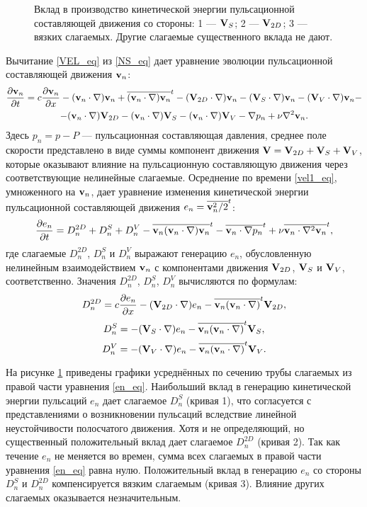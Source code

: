 \begin{figure}
\caption{Вклад в производство кинетической энергии пульсационной составляющей движения со стороны: 1 --- $\mathbf{V}_S$; 2 --- $\mathbf{V}_{2D}$; 3 --- вязких слагаемых. Другие слагаемые существенного вклада не дают.}
\label{e1_parts_pic}
\end{figure}

Вычитание \eqref{VEL_eq} из \eqref{NS_eq} дает уравнение эволюции пульсационной составляющей движения $\mathbf{v}_n$: 
\begin{multline} \label{vel1_eq}
\frac{\partial \mathbf{v}_n}{\partial t} = c \frac{\partial \mathbf{v}_n}{\partial x} - (\mathbf{v}_n \cdot \nabla) \mathbf{v}_n + \overline{(\mathbf{v}_n \cdot \nabla) \mathbf{v}_n}^t - (\mathbf{V}_{2D} \cdot \nabla) \mathbf{v}_n - (\mathbf{V}_S \cdot \nabla) \mathbf{v}_n - (\mathbf{V}_V \cdot \nabla) \mathbf{v}_n - \\ - (\mathbf{v}_n \cdot \nabla) \mathbf{V}_{2D} - (\mathbf{v}_n \cdot \nabla) \mathbf{V}_S - (\mathbf{v}_n \cdot \nabla) \mathbf{V}_V - \nabla p_n + \nu \nabla^2 \mathbf{v}_n. 
\end{multline}
Здесь $p_n = p - P$ --- пульсационная составляющая давления, среднее поле скорости представлено в виде суммы компонент движения $\mathbf{V} = \mathbf{V}_{2D} + \mathbf{V}_S + \mathbf{V}_V$, которые оказывают влияние на пульсационную составляющую движения через соответствующие нелинейные слагаемые. Осреднение по времени \eqref{vel1_eq}, умноженного на $\mathbf{v}_n$, дает уравнение изменения кинетической энергии пульсационной составляющей движения $e_n = \overline{\mathbf{v}_n^2/2}^t$: 
\begin{equation}\label{en_eq}
\frac{\partial e_n}{\partial t} = D_n^{2D} + D_n^{S} + D_n^{V} - \overline{\mathbf{v}_n (\mathbf{v}_n \cdot \nabla) \mathbf{v}_n}^t - \overline{\mathbf{v}_n \cdot \nabla p_n}^t + \nu \overline{\mathbf{v}_n \cdot \nabla^2 \mathbf{v}_n}^t,
\end{equation}
где слагаемые $D_n^{2D}$, $D_n^{S}$ и $D_n^{V}$ выражают генерацию $e_n$, обусловленную нелинейным взаимодействием $\mathbf{v}_n$ с компонентами движения $\mathbf{V}_{2D}$, $\mathbf{V}_S$ и $\mathbf{V}_V$, соответственно. Значения $D_n^{2D}$, $D_n^{S}$, $D_n^{V}$ вычисляются по формулам:
$$
D_n^{2D} = c \frac{\partial e_n}{\partial x}  - (\mathbf{V}_{2D} \cdot \nabla) e_n - \overline{\mathbf{v}_n (\mathbf{v}_n \cdot \nabla) }^t \mathbf{V}_{2D},
$$
$$
D_n^{S}  = - (\mathbf{V}_S \cdot \nabla) e_n - \overline{\mathbf{v}_n (\mathbf{v}_n \cdot \nabla)}^t \mathbf{V}_S,
$$
$$
D_n^{V} =  - (\mathbf{V}_V \cdot \nabla) e_n - \overline{\mathbf{v}_n (\mathbf{v}_n \cdot \nabla)}^t \mathbf{V}_V.
$$

На рисунке \ref{e1_parts_pic} приведены графики усреднённых по сечению трубы слагаемых из правой части уравнения \eqref{en_eq}. Наибольший вклад в генерацию кинетической энергии пульсаций $e_n$ дает слагаемое $D_n^S$ (кривая 1), что согласуется с представлениями о возникновении пульсаций вследствие линейной неустойчивости полосчатого движения. Хотя и не определяющий, но существенный положительный вклад дает слагаемое $D_n^{2D}$ (кривая 2). Так как течение $e_n$ не меняется во времен, сумма всех слагаемых в правой части уравнения \eqref{en_eq} равна нулю. Положительный вклад в генерацию $e_n$ со стороны $D_n^S$ и $D_n^{2D}$ компенсируется вязким слагаемым (кривая 3). Влияние других слагаемых оказывается незначительным. 

